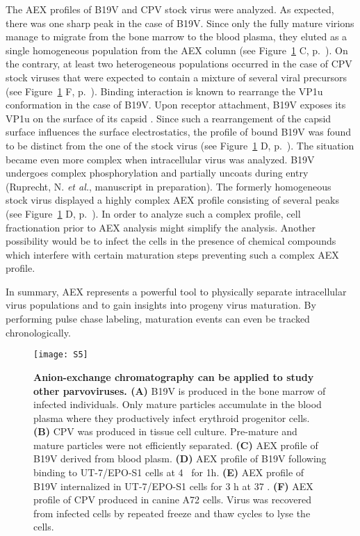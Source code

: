 The AEX profiles of B19V and CPV stock virus were analyzed. As expected, there was one sharp peak in the case of B19V. Since only the fully mature virions manage to migrate from the bone marrow to the blood plasma, they eluted as a single homogeneous population from the AEX column (see Figure~\ref{S5} C, p.~\pageref{S5}). On the contrary, at least two heterogeneous populations occurred in the case of CPV stock viruses that were expected to contain a mixture of several viral precursors (see Figure~\ref{S5} F, p.~\pageref{S5}). Binding interaction is known to rearrange the VP1u conformation in the case of B19V. Upon receptor attachment, B19V exposes its VP1u on the surface of its capsid \cite{pmid20826697}. Since such a rearrangement of the capsid surface influences the surface electrostatics, the profile of bound B19V was found to be distinct from the one of the stock virus (see Figure~\ref{S5} D, p.~\pageref{S5}). The situation became even more complex when intracellular virus was analyzed. B19V undergoes complex phosphorylation and partially uncoats during entry (Ruprecht, N. \textit{et al.}, manuscript in preparation). The formerly homogeneous stock virus displayed a highly complex AEX profile consisting of several peaks (see Figure~\ref{S5} D, p.~\pageref{S5}). In order to analyze such a complex profile, cell fractionation prior to AEX analysis might simplify the analysis. Another possibility would be to infect the cells in the presence of chemical compounds which interfere with certain maturation steps preventing such a complex AEX profile. 

In summary, AEX represents a powerful tool to physically separate intracellular virus populations and to gain insights into progeny virus maturation. By performing pulse chase labeling, maturation events can even be tracked chronologically.         
 






\begin{figure}
\centering
  \texttt{[image: S5]}
  \caption[]
   {\textbf{Anion-exchange chromatography can be applied to study other parvoviruses. (A)} B19V is produced in the bone marrow of infected individuals. Only mature particles accumulate in the blood plasma where they productively infect erythroid progenitor cells. \textbf{(B)} CPV was produced in tissue cell culture. Pre-mature and mature particles were not efficiently separated. \textbf{(C)} AEX profile of B19V derived from blood plasm. \textbf{(D)} AEX profile of B19V following binding to UT-7/EPO-S1 cells at 4 \textcelsius~for 1h. \textbf{(E)} AEX profile of B19V internalized in UT-7/EPO-S1 cells for 3 h at 37 \textcelsius.  \textbf{(F)} AEX profile of CPV produced in canine A72 cells. Virus was recovered from infected cells by repeated freeze and thaw cycles to lyse the cells.} 
\label{S5}
\end{figure}





    




\renewcommand\thefigure{\thechapter.\arabic{figure}} 

